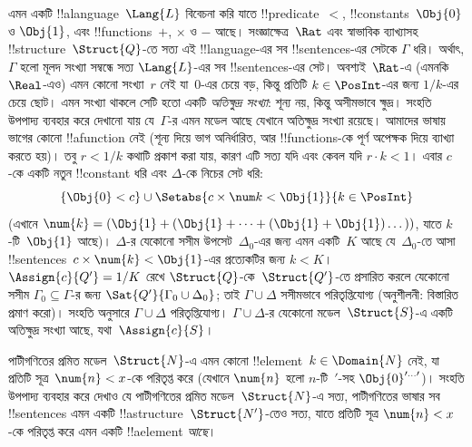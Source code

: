 \documentclass[../../../include/open-logic-section]{subfiles}
\begin{document}
{\begin{ex}
এমন একটি !!a{language}~$\Lang{L}$ বিবেচনা করি যাতে !!{predicate}~$<$,
!!{constant}s~$\Obj{0}$ ও $\Obj{1}$, এবং !!{function}s~$+$, $\times$ ও
$-$ আছে। সংজ্ঞাক্ষেত্র~$\Rat$ এবং স্বাভাবিক ব্যাখ্যাসহ
!!{structure}~$\Struct{Q}$-তে সত্য এই !!{language}-এর সব !!{sentence}s-এর সেটকে
$\Gamma$ ধরি। অর্থাৎ, $\Gamma$ হলো মূলদ সংখ্যা সম্বন্ধে সত্য
$\Lang{L}$-এর সব !!{sentence}s-এর সেট। অবশ্যই~$\Rat$-এ (এমনকি~$\Real$-এও)
এমন কোনো সংখ্যা~$r$ নেই যা~$0$-এর চেয়ে বড়, কিন্তু প্রতিটি $k \in
\PosInt$-এর জন্য $1/k$-এর চেয়ে ছোট। এমন সংখ্যা থাকলে সেটি হতো একটি
\emph{অতিক্ষুদ্র সংখ্যা}: শূন্য নয়, কিন্তু অসীমভাবে ক্ষুদ্র। সংহতি
উপপাদ্য ব্যবহার করে দেখানো যায় যে~$\Gamma$-র এমন মডেল আছে যেখানে
অতিক্ষুদ্র সংখ্যা রয়েছে। আমাদের ভাষায় ভাগের কোনো !!a{function} নেই
(শূন্য দিয়ে ভাগ অনির্ধারিত, আর !!{function}s-কে পূর্ণ অপেক্ষক দিয়ে
ব্যাখ্যা করতে হয়)। তবু $r < 1/k$ কথাটি প্রকাশ করা যায়, কারণ এটি সত্য
যদি এবং কেবল যদি $r \cdot k < 1$। এবার $c$-কে একটি নতুন !!{constant}
ধরি এবং $\Delta$-কে নিচের সেট ধরি:
\[
\{\Obj{0} < c\}
\cup \Setabs{ c \times \num k < \Obj{1} }{k \in \PosInt}
\]
(এখানে $\num{k} = (\Obj{1} + (\Obj{1} + \dots + (\Obj{1} +
\Obj{1})\dots))$, যাতে $k$-টি~$\Obj{1}$ আছে)। $\Delta$-র যেকোনো সসীম
উপসেট~$\Delta_0$-এর জন্য এমন একটি~$K$ আছে যে~$\Delta_0$-তে আসা
!!{sentence}s~$c \times \num{k} < \Obj{1}$-এর প্রত্যেকটির জন্য $k < K$।
$\Assign{c}{Q'} = 1/K$ রেখে $\Struct{Q}$-কে~$\Struct{Q'}$-তে প্রসারিত
করলে যেকোনো সসীম $\Gamma_0 \subseteq \Gamma$-র জন্য
$\Sat{Q'}{\Gamma_0 \cup \Delta_0}$; তাই $\Gamma \cup \Delta$ সসীমভাবে
পরিতৃপ্তিযোগ্য (অনুশীলনী: বিস্তারিত প্রমাণ করো)। সংহতি অনুসারে $\Gamma
\cup \Delta$ পরিতৃপ্তিযোগ্য। $\Gamma \cup \Delta$-র যেকোনো
মডেল~$\Struct{S}$-এ একটি অতিক্ষুদ্র সংখ্যা আছে, যথা~$\Assign{c}{S}$।
\end{ex}
}{}

\begin{prob}
পাটীগণিতের প্রমিত মডেল~$\Struct{N}$-এ এমন কোনো
!!{element}~$k \in \Domain{N}$ নেই, যা প্রতিটি সূত্র~$\num{n} < x$-কে
পরিতৃপ্ত করে (যেখানে $\num{n}$ হলো $n$-টি~$\prime$-সহ
$\Obj{0}^{\prime\dots\prime}$)। সংহতি উপপাদ্য ব্যবহার করে দেখাও যে
পাটীগণিতের প্রমিত মডেল~$\Struct{N}$-এ সত্য, পাটীগণিতের ভাষার
সব
!!{sentence}s এমন একটি !!a{structure}~$\Struct{N'}$-তেও সত্য, যাতে
প্রতিটি সূত্র $\num{n} < x$-কে পরিতৃপ্ত করে এমন একটি !!a{element}
\emph{আছে}।
\end{prob}
\tagendprob
\end{document}
